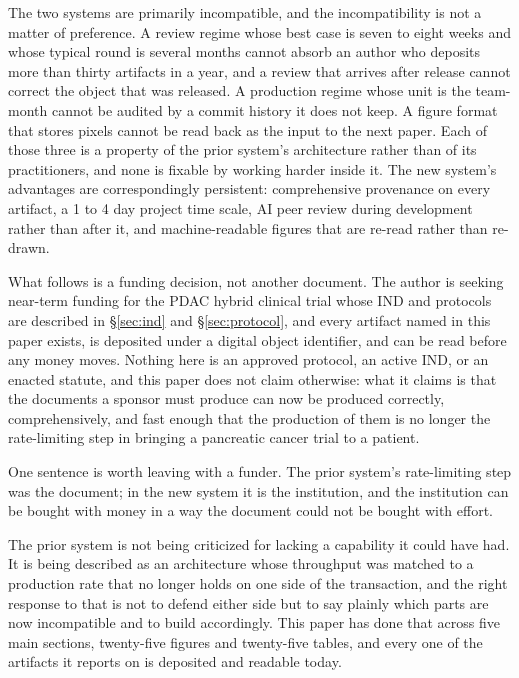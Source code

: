 The two systems are primarily incompatible, and the incompatibility is not a
matter of preference. A review regime whose best case is seven to eight weeks
and whose typical round is several months cannot absorb an author who deposits
more than thirty artifacts in a year, and a review that arrives after release
cannot correct the object that was released. A production regime whose unit is
the team-month cannot be audited by a commit history it does not keep. A figure
format that stores pixels cannot be read back as the input to the next paper.
Each of those three is a property of the prior system's architecture rather than
of its practitioners, and none is fixable by working harder inside it. The new
system's advantages are correspondingly persistent: comprehensive provenance on
every artifact, a 1 to 4 day project time scale, AI peer review during
development rather than after it, and machine-readable figures that are re-read
rather than re-drawn.

What follows is a funding decision, not another document. The author is seeking
near-term funding for the PDAC hybrid clinical trial whose IND and protocols are
described in \S\ref{sec:ind} and \S\ref{sec:protocol}, and every artifact named in this paper exists, is
deposited under a digital object identifier, and can be read before any money
moves. Nothing here is an approved protocol, an active IND, or an enacted
statute, and this paper does not claim otherwise: what it claims is that the
documents a sponsor must produce can now be produced correctly, comprehensively,
and fast enough that the production of them is no longer the rate-limiting step
in bringing a pancreatic cancer trial to a patient.

One sentence is worth leaving with a funder. The prior system's rate-limiting
step was the document; in the new system it is the institution, and the
institution can be bought with money in a way the document could not be bought
with effort.

The prior system is not being criticized for lacking a capability it could have
had. It is being described as an architecture whose throughput was matched to a
production rate that no longer holds on one side of the transaction, and the
right response to that is not to defend either side but to say plainly which
parts are now incompatible and to build accordingly. This paper has done that
across five main sections, twenty-five figures and twenty-five tables, and every
one of the artifacts it reports on is deposited and readable today.
